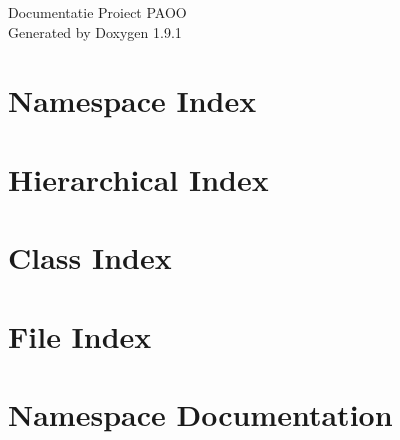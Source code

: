 \let\mypdfximage\pdfximage\def\pdfximage{\immediate\mypdfximage}\documentclass[twoside]{book}
\newcommand{\+}{\discretionary{\mbox{\scriptsize$\hookleftarrow$}}{}{}}
\newcommand{\clearemptydoublepage}{%
  \newpage{\pagestyle{empty}\cleardoublepage}%
}
\begin{document}
\raggedbottom

\hypersetup{pageanchor=false,
             bookmarksnumbered=true,
             pdfencoding=unicode
            }
\begin{titlepage}
\vspace*{7cm}
\begin{center}%
{\Large Documentatie Proiect PAOO }\\
\vspace*{1cm}
{\large Generated by Doxygen 1.9.1}\\
\end{center}
\end{titlepage}
\clearemptydoublepage
{}
\tableofcontents
\clearemptydoublepage
{}
\hypersetup{pageanchor=true}

\chapter{Namespace Index}

\chapter{Hierarchical Index}

\chapter{Class Index}

\chapter{File Index}

\chapter{Namespace Documentation}








\end{document}
